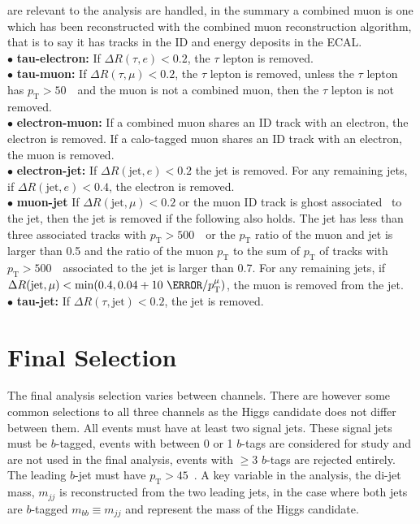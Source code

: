 are relevant to the analysis are handled, in the summary a combined muon is one
which has been reconstructed with the combined muon reconstruction algorithm,
that is to say it has tracks in the ID and energy deposits in the ECAL.\\
$\bullet$ \textbf{tau-electron:} If $\Delta R(\tau,e)<0.2$, the $\tau$ lepton is
removed.\\
%
$\bullet$ \textbf{tau-muon:} If $\Delta R(\tau,\mu)<0.2$, the $\tau$ lepton is
removed, unless the $\tau$ lepton has $p_{\mathrm{T}}>50$~\GeV\ and the muon is
not a combined muon, then the $\tau$ lepton is not removed.\\
%
$\bullet$ \textbf{electron-muon:} If a combined muon shares an ID track with an
electron, the electron is removed. If a calo-tagged muon shares an ID track with
an electron, the muon is removed.\\
%
$\bullet$ \textbf{electron-jet:} If $\Delta R(\text{jet},e)<0.2$ the jet is
removed. For any remaining jets, if $\Delta R(\text{jet},e)<0.4$, the electron
is removed.\\
%
$\bullet$ \textbf{muon-jet} If $\Delta R(\text{jet},\mu)<0.2$ or the muon ID
track is ghost associated~\cite{PERF-2012-02, ghost-ac-01, ghost-ac-02} to the
jet, then the jet is removed if the following also holds. The jet has less than
three associated tracks with $p_{\mathrm{T}} > 500$~\MeV\ or the
$p_{\mathrm{T}}$ ratio of the muon and jet is larger than 0.5 and the ratio of
the muon $p_{\mathrm{T}}$ to the sum of $p_{\mathrm{T}}$ of tracks with
$p_{\mathrm{T}} > 500$~\MeV\ associated to the jet is larger than 0.7. For any
remaining jets, if $\Delta R(\text{jet},\mu)<\min(0.4, 0.04 + 10\ \GeV /
p_{\mathrm{T}}^{\mu})$, the muon is removed from the jet.\\
%
$\bullet$ \textbf{tau-jet:} If $\Delta R(\tau,\text{jet})<0.2$, the jet is
removed.

\section{Final Selection}
\label{sec:selection}

The final analysis selection varies between channels. There are however some
common selections to all three channels as the Higgs candidate does not differ
between them. All events must have at least two signal jets. These signal jets
must be $b$-tagged, events with between 0 or 1 $b$-tags are considered for study
and are not used in the final analysis, events with $\ge3$ $b$-tags are rejected
entirely. The leading $b$-jet must have $p_{\mathrm{T}} > 45$~\GeV. A key
variable in the analysis, the di-jet mass, $m_{jj}$ is reconstructed from the
two leading jets, in the case where both jets are $b$-tagged $m_{bb} \equiv
m_{jj}$ and represent the mass of the Higgs candidate.

